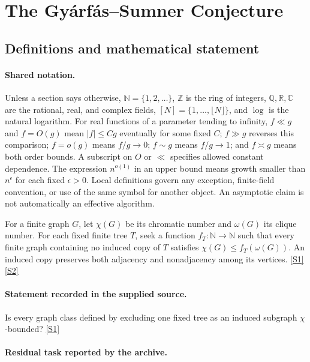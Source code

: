 \documentclass[11pt,a4paper]{article}
\newcommand{\N}{\mathbb{N}}
\newcommand{\Z}{\mathbb{Z}}
\newcommand{\Q}{\mathbb{Q}}
\newcommand{\R}{\mathbb{R}}
\newcommand{\C}{\mathbb{C}}
\newcommand{\sref}[2]{\hyperlink{source:#1:#2}{[S#2]}}
\begin{document}
\section{The Gyárfás--Sumner Conjecture}\label{statement}


\subsection{Definitions and mathematical statement}

\paragraph{Shared notation.}Unless a section says otherwise, $\N=\{1,2,\ldots\}$,
$\Z$ is the ring of integers, $\Q,\R,\C$ are the rational, real, and complex
fields, $[N]=\{1,\ldots,\lfloor N\rfloor\}$, and $\log$ is the natural
logarithm. For real functions of a parameter tending to infinity,
$f\ll g$ and $f=O(g)$ mean $|f|\leq Cg$ eventually for some fixed $C$;
$f\gg g$ reverses this comparison; $f=o(g)$ means $f/g\to0$;
$f\sim g$ means $f/g\to1$; and $f\asymp g$ means both order bounds.
A subscript on $O$ or $\ll$ specifies allowed constant dependence.
The expression $n^{o(1)}$ in an upper bound means growth smaller than
$n^\epsilon$ for each fixed $\epsilon>0$. Local definitions govern any
exception, finite-field convention, or use of the same symbol for another
object. An asymptotic claim is not automatically an effective algorithm.



For a finite graph $G$, let $\chi(G)$ be its chromatic number and $\omega(G)$ its clique number. For each fixed finite tree $T$, seek a function $f_T:\N\to\N$ such that every finite graph containing no induced copy of $T$ satisfies $\chi(G)\leq f_T(\omega(G))$. An induced copy preserves both adjacency and nonadjacency among its vertices. \sref{statement}{1} \sref{statement}{2}

\paragraph{Statement recorded in the supplied source.}
Is every graph class defined by excluding one fixed tree as an induced subgraph \ensuremath{χ}-bounded? \sref{statement}{1}

\paragraph{Residual task reported by the archive.}
\end{document}
